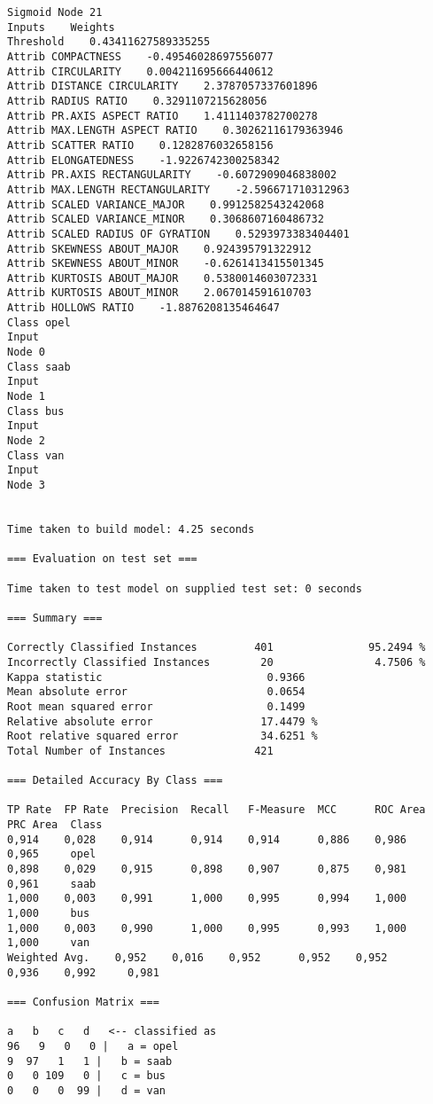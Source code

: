 \documentclass[
	article,			%
	11pt,				%
	oneside,			%
	a4paper,			%
	english,			%
	brazil,				%
	sumario=tradicional
	]{abntex2}
\begin{document}
\begin{lstlisting}
Sigmoid Node 21
Inputs    Weights
Threshold    0.43411627589335255
Attrib COMPACTNESS    -0.49546028697556077
Attrib CIRCULARITY    0.004211695666440612
Attrib DISTANCE CIRCULARITY    2.3787057337601896
Attrib RADIUS RATIO    0.3291107215628056
Attrib PR.AXIS ASPECT RATIO    1.4111403782700278
Attrib MAX.LENGTH ASPECT RATIO    0.30262116179363946
Attrib SCATTER RATIO    0.1282876032658156
Attrib ELONGATEDNESS    -1.9226742300258342
Attrib PR.AXIS RECTANGULARITY    -0.6072909046838002
Attrib MAX.LENGTH RECTANGULARITY    -2.596671710312963
Attrib SCALED VARIANCE_MAJOR    0.9912582543242068
Attrib SCALED VARIANCE_MINOR    0.3068607160486732
Attrib SCALED RADIUS OF GYRATION    0.5293973383404401
Attrib SKEWNESS ABOUT_MAJOR    0.924395791322912
Attrib SKEWNESS ABOUT_MINOR    -0.6261413415501345
Attrib KURTOSIS ABOUT_MAJOR    0.5380014603072331
Attrib KURTOSIS ABOUT_MINOR    2.067014591610703
Attrib HOLLOWS RATIO    -1.8876208135464647
Class opel
Input
Node 0
Class saab
Input
Node 1
Class bus
Input
Node 2
Class van
Input
Node 3


Time taken to build model: 4.25 seconds

=== Evaluation on test set ===

Time taken to test model on supplied test set: 0 seconds

=== Summary ===

Correctly Classified Instances         401               95.2494 %
Incorrectly Classified Instances        20                4.7506 %
Kappa statistic                          0.9366
Mean absolute error                      0.0654
Root mean squared error                  0.1499
Relative absolute error                 17.4479 %
Root relative squared error             34.6251 %
Total Number of Instances              421     

=== Detailed Accuracy By Class ===

TP Rate  FP Rate  Precision  Recall   F-Measure  MCC      ROC Area  PRC Area  Class
0,914    0,028    0,914      0,914    0,914      0,886    0,986     0,965     opel
0,898    0,029    0,915      0,898    0,907      0,875    0,981     0,961     saab
1,000    0,003    0,991      1,000    0,995      0,994    1,000     1,000     bus
1,000    0,003    0,990      1,000    0,995      0,993    1,000     1,000     van
Weighted Avg.    0,952    0,016    0,952      0,952    0,952      0,936    0,992     0,981     

=== Confusion Matrix ===

a   b   c   d   <-- classified as
96   9   0   0 |   a = opel
9  97   1   1 |   b = saab
0   0 109   0 |   c = bus
0   0   0  99 |   d = van


\end{lstlisting}
\end{document}

